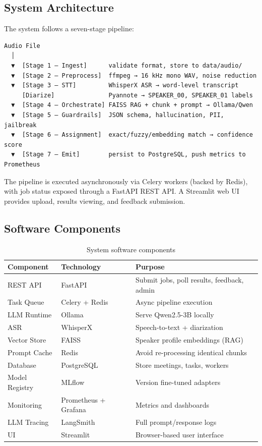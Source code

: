 \documentclass[12pt,a4paper]{article}
\begin{document}
\subsection{System Architecture}

The system follows a seven-stage pipeline:

\begin{lstlisting}
Audio File
  │
  ▼  [Stage 1 — Ingest]      validate format, store to data/audio/
  ▼  [Stage 2 — Preprocess]  ffmpeg → 16 kHz mono WAV, noise reduction
  ▼  [Stage 3 — STT]         WhisperX ASR → word-level transcript
     [Diarize]               Pyannote → SPEAKER_00, SPEAKER_01 labels
  ▼  [Stage 4 — Orchestrate] FAISS RAG + chunk + prompt → Ollama/Qwen
  ▼  [Stage 5 — Guardrails]  JSON schema, hallucination, PII, jailbreak
  ▼  [Stage 6 — Assignment]  exact/fuzzy/embedding match → confidence score
  ▼  [Stage 7 — Emit]        persist to PostgreSQL, push metrics to Prometheus
\end{lstlisting}

The pipeline is executed asynchronously via Celery workers (backed by Redis), with job status exposed through a FastAPI REST API. A Streamlit web UI provides upload, results viewing, and feedback submission.

\subsection{Software Components}

\begin{table}[H]
\centering
\begin{tabular}{lll}
\toprule
\textbf{Component} & \textbf{Technology} & \textbf{Purpose} \\
\midrule
REST API & FastAPI & Submit jobs, poll results, feedback, admin \\
Task Queue & Celery + Redis & Async pipeline execution \\
LLM Runtime & Ollama & Serve Qwen2.5-3B locally \\
ASR & WhisperX & Speech-to-text + diarization \\
Vector Store & FAISS & Speaker profile embeddings (RAG) \\
Prompt Cache & Redis & Avoid re-processing identical chunks \\
Database & PostgreSQL & Store meetings, tasks, workers \\
Model Registry & MLflow & Version fine-tuned adapters \\
Monitoring & Prometheus + Grafana & Metrics and dashboards \\
LLM Tracing & LangSmith & Full prompt/response logs \\
UI & Streamlit & Browser-based user interface \\
\bottomrule
\end{tabular}
\caption{System software components}
\end{table}
\end{document}
